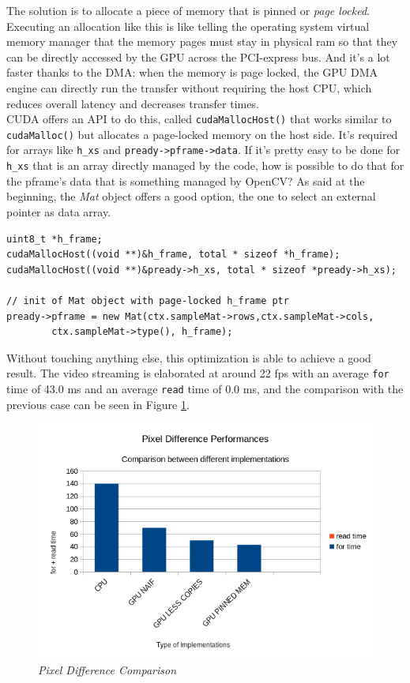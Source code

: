 \documentclass[paper=a4, fontsize=10pt]{scrartcl}	%
\begin{document}
	The solution is to allocate a piece of memory that is pinned or \textit{page locked}. Executing an allocation like this is like telling the operating system virtual memory manager that the memory pages must stay in physical ram so that they can be directly accessed by the GPU across the PCI-express bus. And it's a lot faster thanks to the DMA: when the memory is page locked, the GPU DMA engine can directly run the transfer without requiring the host CPU, which reduces overall latency and decreases transfer times.\\

	CUDA offers an API to do this, called \texttt{cudaMallocHost()} that works similar to \texttt{cudaMalloc()} but allocates a page-locked memory on the host side. It's required for arrays like \texttt{h\_xs} and \texttt{pready->pframe->data}. If it's pretty easy to be done for \texttt{h\_xs} that is an array directly managed by the code, how is possible to do that for the pframe's data that is something managed by OpenCV? As said at the beginning, the \textit{Mat} object offers a good option, the one to select an external pointer as data array.\\

	\begin{lstlisting}[style=CStyle]
uint8_t *h_frame;
cudaMallocHost((void **)&h_frame, total * sizeof *h_frame);
cudaMallocHost((void **)&pready->h_xs, total * sizeof *pready->h_xs);

// init of Mat object with page-locked h_frame ptr
pready->pframe = new Mat(ctx.sampleMat->rows,ctx.sampleMat->cols,
		ctx.sampleMat->type(), h_frame); 
	\end{lstlisting}

	Without touching anything else, this optimization is able to achieve a good result. The video streaming is elaborated at around 22 fps with an average \texttt{for} time of 43.0 ms and an average \texttt{read} time of 0.0 ms, and the comparison with the previous case can be seen in Figure \ref{fig:chart4}. 

	\begin{figure}[H]
		\centering
		\includegraphics[width=0.8\linewidth]{images/chart4.png}
		\caption{\textit{Pixel Difference Comparison}}
		\label{fig:chart4}
	\end{figure}
\end{document}
